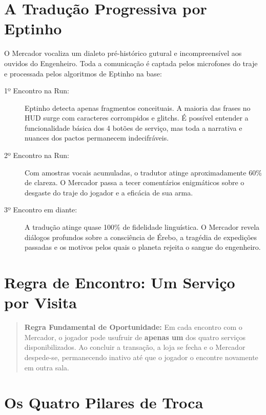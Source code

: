\documentclass[a4paper,12pt]{report}
\begin{document}
\section{A Tradução Progressiva por Eptinho}
O Mercador vocaliza um dialeto pré-histórico gutural e incompreensível aos ouvidos do Engenheiro. Toda a comunicação é captada pelos microfones do traje e processada pelos algoritmos de Eptinho na base:
\begin{description}
    \item[1º Encontro na Run:] Eptinho detecta apenas fragmentos conceituais. A maioria das frases no HUD surge com caracteres corrompidos e glitchs. É possível entender a funcionalidade básica dos 4 botões de serviço, mas toda a narrativa e nuances dos pactos permanecem indecifráveis.
    \item[2º Encontro na Run:] Com amostras vocais acumuladas, o tradutor atinge aproximadamente 60\% de clareza. O Mercador passa a tecer comentários enigmáticos sobre o desgaste do traje do jogador e a eficácia de sua arma.
    \item[3º Encontro em diante:] A tradução atinge quase 100\% de fidelidade linguística. O Mercador revela diálogos profundos sobre a consciência de Érebo, a tragédia de expedições passadas e os motivos pelos quais o planeta rejeita o sangue do engenheiro.
\end{description}

\section{Regra de Encontro: Um Serviço por Visita}
\begin{quote}
    \textbf{Regra Fundamental de Oportunidade:} Em cada encontro com o Mercador, o jogador pode usufruir de \textbf{apenas um} dos quatro serviços disponibilizados. Ao concluir a transação, a loja se fecha e o Mercador despede-se, permanecendo inativo até que o jogador o encontre novamente em outra sala.
\end{quote}

\section{Os Quatro Pilares de Troca}
\end{document}
